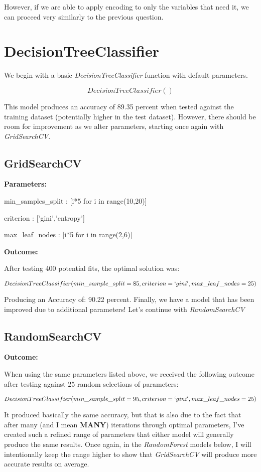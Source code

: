 \documentclass[notitlepage]{report}
\begin{document}
However, if we are able to apply encoding to only the variables that need it, we can proceed very similarly to the previous question.

\section*{DecisionTreeClassifier}
We begin with a basic \textit{DecisionTreeClassifier} function with default parameters.

$$
DecisionTreeClassifier()
$$

This model produces an accuracy of 89.35 percent when tested against the training dataset (potentially higher in the test dataset). However, there should be room for improvement as we alter parameters, starting once again with \textit{GridSearchCV}.

\subsection*{GridSearchCV}

\textbf{Parameters:}

\qquad min\_samples\_split : [i*5 for i in range(10,20)]

\qquad criterion : ['gini','entropy']

\qquad max\_leaf\_nodes : [i*5 for i in range(2,6)]

\textbf{Outcome:}

After testing 400 potential fits, the optimal solution was:

$$
DecisionTreeClassifier(min\_sample\_split=85,criterion=`gini',max\_leaf\_nodes=25)
$$

Producing an Accuracy of: 90.22 percent. Finally, we have a model that has been improved due to additional parameters! Let's continue with \textit{RandomSearchCV}

\subsection*{RandomSearchCV}

\textbf{Outcome:}

When using the same parameters listed above, we received the following outcome after testing against 25 random selections of parameters:

$$
DecisionTreeClassifier(min\_sample\_split=95,criterion=`gini',max\_leaf\_nodes=25)
$$

It produced basically the same accuracy, but that is also due to the fact that after many (and I mean \textbf{MANY}) iterations through optimal parameters, I've created such a refined range of parameters that either model will generally produce the same results. Once again, in the \textit{RandomForest} models below, I will intentionally keep the range higher to show that \textit{GridSearchCV} will produce more accurate results on average.
\end{document}
